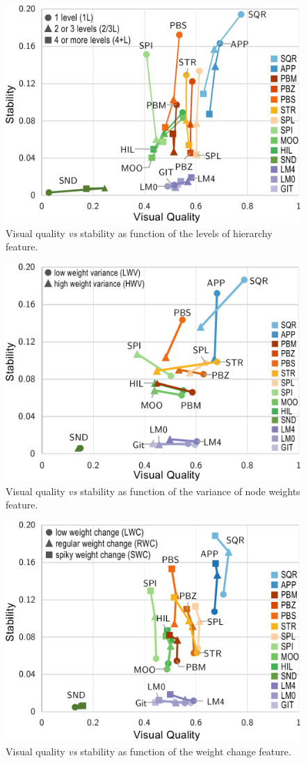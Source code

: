 \begin{figure}[h!]
 \centering
    \includegraphics[width=.7\linewidth]{figures/treemap-evaluation/DepthPlot}
    \caption{Visual quality \emph{vs} stability as function of the levels of hierarchy feature.}
    \label{fig:depth}
\end{figure}

\begin{figure}[h!]
\centering
    \includegraphics[width=.7\linewidth]{figures/treemap-evaluation/weightVariancePlot}
    \caption{Visual quality \emph{vs} stability as function of the variance of node weights feature.}
    \label{fig:weightVariance}
\end{figure}

\begin{figure}[h!]
  \centering
    \includegraphics[width=.7\linewidth]{figures/treemap-evaluation/WeightChangePlot}
    \caption{Visual quality \emph{vs} stability as function of the weight change feature.}
    \label{fig:weightChange}
\end{figure}


